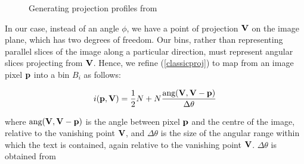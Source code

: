 \begin{figure}[t]
\centering
\begin{center}
\end{center}
\caption{Generating projection profiles from }
\label{projprofsfig}
\end{figure}




In our case, instead of an angle $\phi$, we have a point of projection
${ \bf V }$ on the image plane, which has two degrees of freedom.  Our bins,
rather than representing parallel slices of the image along a particular
direction, must represent angular slices projecting from ${ \bf V }$.  Hence, we
refine (\ref{classicproj}) to map from an image pixel ${ \bf p }$ into a bin
$B_i$ as follows:


\begin{equation} \label{persproj} i( { \bf p,{ \bf V } } ) = \frac{1}{2} N + N \frac{ \mbox{ang}({ \bf V },{ \bf V }-{ \bf p }) }{ \Delta \theta } \end{equation}

{ \parindent 0mm 
where $\mbox{ang}({ \bf V },{ \bf V }-{ \bf p })$ is the angle
between pixel ${ \bf p }$ and the centre of the image, relative to the vanishing
point ${ \bf V }$, and $\Delta \theta$ is the size of the angular range within
which the text is contained, again relative to the vanishing point
${ \bf V }$. $ \Delta \theta$ is obtained from 
}

